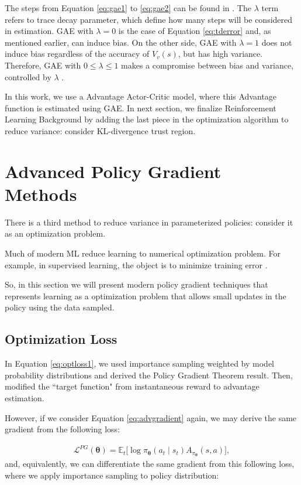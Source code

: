 The steps from Equation \eqref{eq:gae1} to \eqref{eq:gae2} can be found in \cite{DBLP:journals/corr/SchulmanMLJA15}. The $\lambda$ term refers to trace decay parameter, which define how many steps will be considered in estimation. GAE with $\lambda = 0$ is the case of Equation \eqref{eq:tderror} and, as mentioned earlier, can induce bias. On the other side, GAE with $\lambda = 1$ does not induce bias regardless of the accuracy of $V_{v}(s)$, but has high variance. Therefore, GAE with $0 \leq \lambda \leq 1$ makes a compromise between bias and variance, controlled by $\lambda$ \cite{DBLP:journals/corr/SchulmanMLJA15}.

In this work, we use a Advantage Actor-Critic model, where this Advantage function is estimated using GAE. In next section, we finalize Reinforcement Learning Background by adding the last piece in the optimization algorithm to reduce variance: consider KL-divergence trust region.

\section{Advanced Policy Gradient Methods}
There is a third method to reduce variance in parameterized policies: consider it as an optimization problem.

Much of modern ML reduce learning to numerical optimization problem. For example, in supervised learning, the object is to minimize training error \cite{deeprlbootcamplec5}.

So, in this section we will present modern policy gradient techniques that represents learning as a optimization problem that allows small updates in the policy using the data sampled.

\subsection{Optimization Loss}
In Equation \ref{eq:optloss1}, we used importance sampling weighted by model probability distributions and derived the Policy Gradient Theorem result. Then, modified the ``target function" from instantaneous reward to advantage estimation.

However, if we consider Equation \eqref{eq:advgradient} again, we may derive the same gradient from the following loss:

\begin{eqnarray}\label{eq:logprobloss}
\mathcal{L}^{PG}(\boldsymbol{\theta}) = \mathbb{E}_{t}\Big[\log{\pi_{\boldsymbol{\theta}}} (a_{t} \mid s_{t} )A_{\pi_{\boldsymbol{\theta}}}(s,a)\Big],
\end{eqnarray}
and, equivalently, we can differentiate the same gradient from this following loss, where we apply importance sampling to policy distribution:

